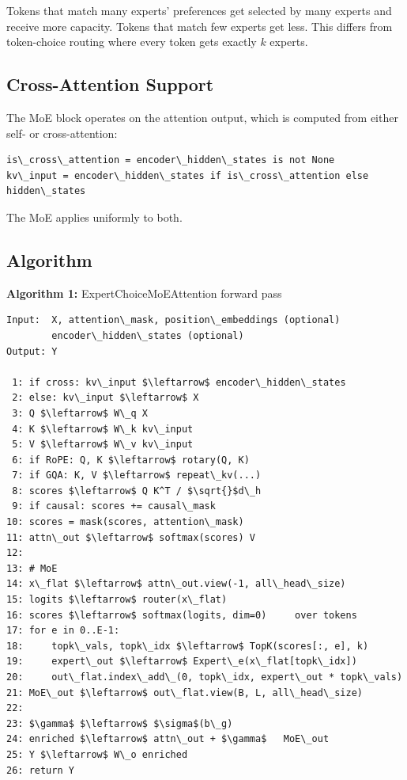 Tokens that match many experts' preferences get selected by many experts 
and receive more capacity. Tokens that match few experts get less. This 
differs from token-choice routing where every token gets exactly $k$ 
experts.

\subsection{Cross-Attention Support}

The MoE block operates on the attention output, which is computed from 
either self- or cross-attention:

\begin{lstlisting}
is\_cross\_attention = encoder\_hidden\_states is not None
kv\_input = encoder\_hidden\_states if is\_cross\_attention else hidden\_states
\end{lstlisting}

The MoE applies uniformly to both.

\subsection{Algorithm}

\textbf{Algorithm 1:} ExpertChoiceMoEAttention forward pass
\begin{lstlisting}
Input:  X, attention\_mask, position\_embeddings (optional)
        encoder\_hidden\_states (optional)
Output: Y

 1: if cross: kv\_input $\leftarrow$ encoder\_hidden\_states
 2: else: kv\_input $\leftarrow$ X
 3: Q $\leftarrow$ W\_q X
 4: K $\leftarrow$ W\_k kv\_input
 5: V $\leftarrow$ W\_v kv\_input
 6: if RoPE: Q, K $\leftarrow$ rotary(Q, K)
 7: if GQA: K, V $\leftarrow$ repeat\_kv(...)
 8: scores $\leftarrow$ Q K^T / $\sqrt{}$d\_h
 9: if causal: scores += causal\_mask
10: scores = mask(scores, attention\_mask)
11: attn\_out $\leftarrow$ softmax(scores) V
12:
13: # MoE
14: x\_flat $\leftarrow$ attn\_out.view(-1, all\_head\_size)
15: logits $\leftarrow$ router(x\_flat)
16: scores $\leftarrow$ softmax(logits, dim=0)     over tokens
17: for e in 0..E-1:
18:     topk\_vals, topk\_idx $\leftarrow$ TopK(scores[:, e], k)
19:     expert\_out $\leftarrow$ Expert\_e(x\_flat[topk\_idx])
20:     out\_flat.index\_add\_(0, topk\_idx, expert\_out * topk\_vals)
21: MoE\_out $\leftarrow$ out\_flat.view(B, L, all\_head\_size)
22:
23: $\gamma$ $\leftarrow$ $\sigma$(b\_g)
24: enriched $\leftarrow$ attn\_out + $\gamma$   MoE\_out
25: Y $\leftarrow$ W\_o enriched
26: return Y
\end{lstlisting}

